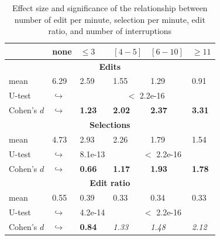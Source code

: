 \documentclass[times]{smrauth}
\begin{document}
\begin{table}[ht!]
\tiny
\renewcommand{\arraystretch}{1.3}
\caption{Effect size and significance of the relationship between number of edit per minute, selection per minute, edit ratio, and number of interruptions} 
\label{tbl:p_value}
\centering
\begin{tabular}{l | p{0.75cm} | p{1.2cm} | p{1.2cm} | p{1.2cm} |p{1.2cm}} 

   & none & $\leq 3$ & $[4 - 5]$ & $[6 - 10]$ & $\geq 11$  \\  
  \hline
  \multicolumn{6}{c}{\textbf{Edits}} \\
  \hline
  mean & 6.29 &	2.59 & 1.55 & 1.29 & 0.91  \\ 
   \cline{3-6} 
  U-test & $\hookrightarrow$ & \multicolumn{4}{c}{$<$ 2.2e-16} \\
  \cline{3-6} 
  Cohen's $d$ & $\hookrightarrow$	& \textbf{1.23} & \textbf{2.02} & \textbf{2.37} & \textbf{3.31}    \\
  \hline
  
  
  \multicolumn{6}{c}{\textbf{Selections}} \\
  \hline 
  mean & 4.73 &	2.93 & 2.26 & 1.79 & 1.54  \\ 
     \cline{3-6} 
    U-test & $\hookrightarrow$ & 8.1e-13 & \multicolumn{3}{c}{$<$ 2.2e-16} \\
    
  \cline{3-6} 
  Cohen's $d$ & $\hookrightarrow$	& \textbf{0.66} & \textbf{1.17} & \textbf{1.93} & \textbf{1.78} \\  
\hline


  \multicolumn{6}{c}{\textbf{Edit ratio}} \\
  \hline 
  mean & 0.55 & 0.39 & 0.33 & 0.34 & 0.33 \\ 
  \cline{3-6} 
     \cline{3-6} 
    U-test & $\hookrightarrow$ & 4.2e-14 & \multicolumn{3}{c}{$<$ 2.2e-16} \\
    \cline{3-6} 
    Cohen's $d$ & $\hookrightarrow$ & \textbf{0.84} & \textit{1.33} & \textit{1.48} & \textit{2.12} \\ 
\hline

\end{tabular}
\end{table}
\end{document}
